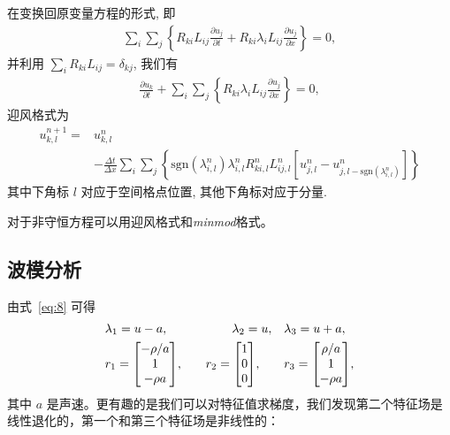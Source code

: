 \documentclass[10.5pt
]{article}
\begin{document}
在变换回原变量方程的形式, 即
\begin{align}
\sum_i \sum_j \left\{R_{ki} L_{ij} \frac{\partial u_j}{\partial t} + R_{ki} \lambda_i L_{ij}
\frac{\partial u_j}{\partial x}\right\} = 0,
\end{align}
并利用 $\sum_i R_{ki} L_{ij} = \delta_{kj}$, 我们有
\begin{align}
\frac{\partial u_k}{\partial t} + \sum_i \sum_j \left\{R_{ki} \lambda_i L_{ij} \frac{\partial
u_j}{\partial x}\right\} = 0,
\end{align}
迎风格式为
\begin{align}
u_{k,l}^{n+1} =& u_{k,l}^n \nonumber\\
& - \frac{\Delta t}{\Delta x} \sum_i \sum_j \left\{\text{sgn}(\lambda_{i,l}^n)
 \lambda_{i,l}^n R_{ki,l}^n L_{ij,l}^n \left[u_{j,l}^n - u_{j,l-\text{sgn}(\lambda_{i,l}^n)}^n\right]\right\}
\end{align}
其中下角标 $l$ 对应于空间格点位置, 其他下角标对应于分量.

对于非守恒方程可以用迎风格式和\textit{minmod}格式。

\subsection{波模分析}
由式~\eqref{eq:8} 可得
\begin{equation}
	\begin{aligned}
		&\lambda_1 = u - a, \quad &\lambda_2  = u, \quad &\lambda_3 = u + a, \\
		&r_1 = \mqty[- \rho / a \\ 1 \\ -\rho a], \quad
		&r_2 = \mqty[1 \\ 0 \\ 0], \qquad
		&r_3 = \mqty[\rho / a \\ 1 \\ -\rho a],
	\end{aligned}
\end{equation}
其中 $a$ 是声速。更有趣的是我们可以对特征值求梯度，我们发现第二个特征场是线性退化的，第一个和第三个特征场是非线性的：
\end{document}

